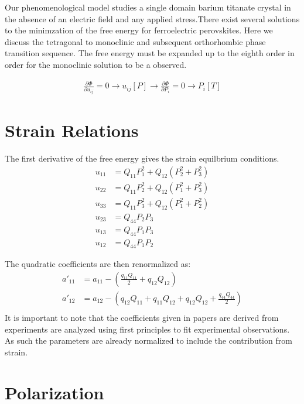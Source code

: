 \documentclass{article}
\begin{document}
Our phenomenological model studies a single domain barium titanate crystal in the absence of an electric field and any applied stress.There exist several solutions to the minimzation of the free energy for ferroelectric perovskites.  Here we discuss the tetragonal to monoclinic and subsequent orthorhombic phase transition sequence.  The free energy must be expanded up to the eighth order in order for the monoclinic solution to be a observed.

\label{sec:Formulation}
\begin{align}
\frac{\partial \Phi}{\partial u_{ij}}=0 \to u_{ij}[P]\to \frac{\partial \Phi}{\partial P_i}=0 \to P_i[T]
\end{align}

\section{Strain Relations}
\label{sec:Strain}
The first derivative of the free energy gives the strain equilbrium conditions.
\begin{align}
u_{11} &= Q_{11} P_1^2 + Q_{12}(P_2^2 + P_3^2) \\
u_{22} &= Q_{11} P_2^2 + Q_{12}(P_1^2 + P_3^2) \\
u_{33} &= Q_{11} P_3^2 + Q_{12}(P_1^2 + P_2^2) \\
u_{23} &= Q_{44}P_2P_3 \\
u_{13} &=  Q_{44}P_1P_3 \\
u_{12} &=  Q_{44}P_1P_2
\end{align}

The quadratic coefficients are then renormalized as:
\begin{align}
a'_{11} &=  a_{11}-( \frac{q_{11} Q_{11}}{2}+q_{12}Q_{12}) \\
a'_{12} &= a_{12}-(q_{12} Q_{11}+q_{11} Q_{12}+q_{12} Q_{12}+\frac{q_{44} Q_{44}}{2}) \\
\end{align}
It is important to note that the coefficients given in papers are derived from experiments are analyzed using first principles to fit experimental observations.  As such the parameters are already normalized to include the contribution from strain.


\newpage
\section{Polarization}
\end{document}

